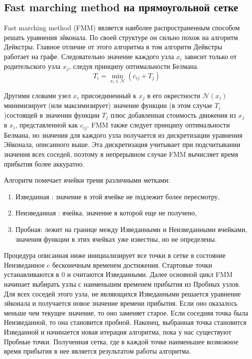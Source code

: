 \subsection{Fast marching method на прямоугольной сетке}
\label{sec:fast-marching-method}

Fast marching method (FMM) \cite{S1999} является наиболее
распространенным способом решать уравнения эйконала. По своей
структуре он сильно похож на алгоритм Дейкстры. Главное отличие от
этого алгоритма в том алгоритм Дейкстры работает на
графе. Следовательно значение каждого узла $x_i$ зависит только от
родительского узла ${x_j}$, следуя принципу оптимальности Белмана.
\begin{equation*}
  T_i = \min_{x_i\in \mathcal{N}} (c_{ij} + T_j)
\end{equation*}

Другими словами узел $x_i$ присоединенный к $x_j$ в его
окрестности $\mathcal{N}(x_i)$ минимизирует (или
максимизирует) значение функции (в этом случае $T_i$)состоящей в
значении функции $T_j$ плюс добавленная стоимость движения из $x_j$ в
$x_i$, представленной как $c_{ij}$.
FMM также следует принципу оптимальности Белмана, но значения для
каждого узла получается из дискретизации уравнения Эйконала,
описанного выше. Эта дискретизация учитывает при подсчитывании
значения всех соседей, поэтому в непрерывном случае FMM вычисляет
время прибытия более аккуратно.

Алгоритм помечает ячейки тремя различными метками:
\begin{enumerate}
\item Изведанная : значение в этой ячейке не подлежит более
  пересмотру,
\item Неизведанная : ячейка, значение в которой еще не
  получено,
\item Пробная: лежит на границе между Изведанными
  и Неизведанными ячейками, значения функции в этих ячейках
  уже известны, но не определены.
\end{enumerate}

Процедура описанная ниже инициализирует все точки в сетке в состояние
Неизведанное c бесконечным временем достижения. Стартовые
точки устанавливаются в $0$ и считаются Изведанными. Далее основной
цикл FMM начинает выбирать узлы с наименьшим временем прибытия из
Пробных узлов. Для всех соседей этого узла, не являющихся
Изведанными решается уравнение эйконала и получается новое
значение времени прибытия. Если оно оказалось меньше чем текущее
значение, то оно заменяет старое. Если соседняя точка была
Неизведанной, то она становится пробной. Наконец, выбранная
точка становится Изведанной и начинается новая итерация
алгоритма, пока у нас существуют Пробные точки. Полученная
сетка, где в каждой точке наименьшее возможное время прибытия в нее
является результатом работы алгоритма.

